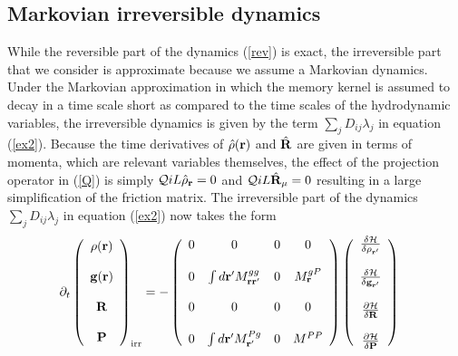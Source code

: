 \documentclass[b5paper,openright,10pt]{book}
\begin{document}
\subsection{Markovian irreversible dynamics}
While the  reversible part of  the dynamics (\ref{rev}) is  exact, the
irreversible  part  that we  consider  is  approximate
because  we assume a  Markovian dynamics.   Under the  Markovian
approximation in which the memory kernel is assumed to decay in a time
scale  short  as compared  to  the  time  scales of  the  hydrodynamic
variables,   the  irreversible   dynamics   is  given   by  the   term
$\sum_jD_{ij}\lambda_j$   in  equation   (\ref{ex2}).   Because   the  time
derivatives of  $\hat{\rho}({\bf r})$ and  $\hat{{\bf R}}$  are given in  terms of
momenta, which  are relevant variables  themselves, the effect  of the
projection operator in (\ref{Q}) is simply ${\cal Q} iL\hat{\rho}_{\bf r}=0$
and ${\cal Q}  iL\hat{{\bf R}}_{\mu}=0$ resulting in  a large simplification
of  the  friction  matrix.   The irreversible  part  of  the  dynamics
$\sum_jD_{ij}\lambda_j$ in equation (\ref{ex2}) now takes the form
\begin{align}
\partial_t  \left(
    \begin{array}{c}
\rho({\bf r})\\
\\
{\bf g}({\bf r})\\
\\
{\bf R}\\
\\
{\bf P}
    \end{array}
\right)_{\rm irr}
&=
-\left(\begin{array}{cccc}
  0&0 &0&0\\
\\
0 &\int d{\bf r}'M^{gg}_{{\bf r}{\bf r}'}&0&M^{gP}_{\bf r}\\
\\
  0&0 &0&0\\
\\
0&\int d{\bf r}' M^{Pg}_{{\bf r}'}&0&M^{PP}
\end{array}\right)
\left(    \begin{array}{c}
\frac{\delta {\cal H}}{\delta \rho_{{\bf r}'}}\\
\\
\frac{\delta {\cal H}}{\delta {\bf g}_{{\bf r}'}}\\
\\
\frac{\partial {\cal H}}{\delta {\bf R}}\\
\\
\frac{\partial {\cal H}}{\delta {\bf P}}
    \end{array}
\right)
\label{irr1}
\end{align}
\end{document}

